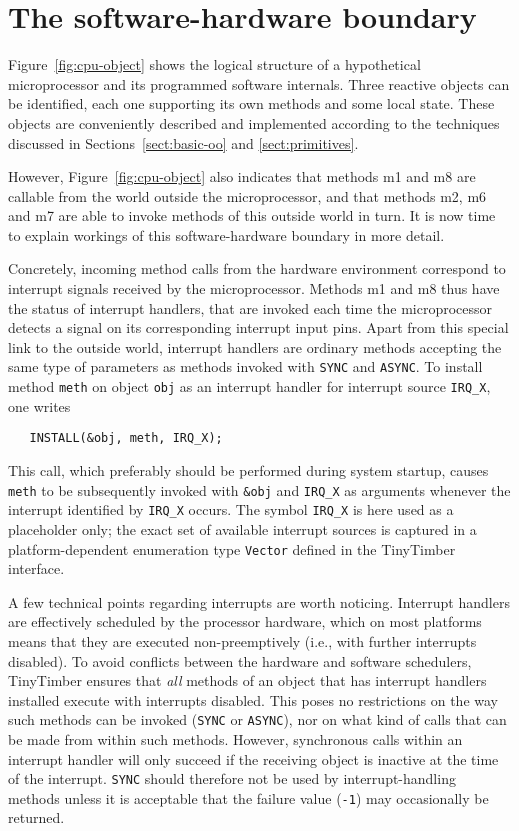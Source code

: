 \documentclass[12pt]{article}
\begin{document}
\section{The software-hardware boundary}
\label{sect:top-level}

Figure~\ref{fig:cpu-object} shows the logical structure of a hypothetical microprocessor and its programmed software internals.  Three reactive objects can be identified, each one supporting its own methods and some local state.  These objects are conveniently described and implemented according to the techniques discussed in Sections~\ref{sect:basic-oo} and \ref{sect:primitives}.  

However, Figure~\ref{fig:cpu-object} also indicates that methods m1 and m8 are callable from the world outside the microprocessor, and that methods m2, m6 and m7 are able to invoke methods of this outside world in turn. It is now time to explain workings of this software-hardware boundary in more detail.

Concretely, incoming method calls from the hardware environment correspond to interrupt signals received by the microprocessor. Methods m1 and m8 thus have the status of interrupt handlers, that are invoked each time the microprocessor detects a signal on its corresponding interrupt input pins. Apart from this special link to the outside world, interrupt handlers are ordinary methods accepting the same type of parameters as methods invoked with {\tt SYNC} and {\tt ASYNC}. To install method {\tt meth} on object {\tt obj} as an interrupt handler for interrupt source {\tt IRQ\_X}, one writes
\begin{verbatim}
   INSTALL(&obj, meth, IRQ_X);
\end{verbatim}
This call, which preferably should be performed during system startup, causes {\tt meth} to be subsequently invoked with {\tt \&obj} and {\tt IRQ\_X} as arguments whenever the interrupt identified by {\tt IRQ\_X} occurs. The symbol {\tt IRQ\_X} is here used as a placeholder only; the exact set of available interrupt sources is captured in a platform-dependent enumeration type {\tt Vector} defined in the TinyTimber interface.

A few technical points regarding interrupts are worth noticing. Interrupt handlers are effectively scheduled by the processor hardware, which on most platforms means that they are executed non-preemptively (i.e., with further interrupts disabled). To avoid conflicts between the hardware and software schedulers, TinyTimber ensures that {\em all} methods of an object that has interrupt handlers installed execute with interrupts disabled. This poses no restrictions on the way such methods can be invoked ({\tt SYNC} or {\tt ASYNC}), nor on what kind of calls that can be made from within such methods. However, synchronous calls within an interrupt handler will only succeed if the receiving object is inactive at the time of the interrupt.  {\tt SYNC} should therefore not be used by interrupt-handling methods unless it is acceptable that the failure value ({\tt -1}) may occasionally be returned. 
\end{document}
